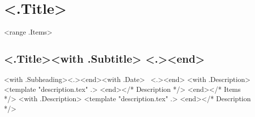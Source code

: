 \section{<.Title>}
<range .Items>
\subsection{\textbf{<.Title>}<with .Subtitle> <.><end>}
<with .Subheading><.><end><with .Date> \hfill \faCalendar \ <.><end>
<with .Description>
<template "description.tex" .>
<end></* Description */>
<end></* Items */>
<with .Description>
<template "description.tex" .>
<end></* Description */>